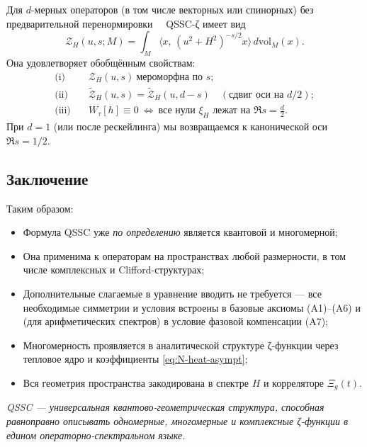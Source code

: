 \documentclass{article}
\numberwithin{equation}{section}
\theoremstyle{plain}
\theoremstyle{definition}
\theoremstyle{remark}
\begin{document}
Для \(d\)-мерных операторов (в том числе векторных или спинорных) без предварительной перенормировки  
QSSC-ζ имеет вид
\begin{equation}\label{eq:N-QSSC-general}
\mathcal Z_H(u,s;M)
=\int_M \big\langle x,\,(u^2+H^2)^{-s/2}x\big\rangle\,d\mathrm{vol}_M(x).
\end{equation}
Она удовлетворяет обобщённым свойствам:
\begin{align}
\text{(i)}\quad & \mathcal Z_H(u,s)\ \text{мероморфна по } s; \\
\text{(ii)}\quad & \widetilde{\mathcal Z}_H(u,s)=\widetilde{\mathcal Z}_H(u,d-s) \quad (\text{сдвиг оси на } d/2); \\
\text{(iii)}\quad & W_\tau[h]\equiv0\ \Longleftrightarrow\ \text{все нули }\xi_H\text{ лежат на }\Re s=\frac{d}{2}.
\end{align}
При \(d=1\) (или после рескейлинга) мы возвращаемся к канонической оси \(\Re s = 1/2\).
~\cite{Seeley1967, Elizalde1995}

\subsection*{Заключение}

Таким образом:

\begin{itemize}
\item Формула QSSC уже \emph{по определению} является квантовой и многомерной;
\item Она применима к операторам на пространствах любой размерности, в том числе комплексных и Clifford-структурах;
\item Дополнительные слагаемые в уравнение вводить не требуется — все необходимые симметрии и условия встроены в базовые аксиомы (A1)–(A6) и (для арифметических спектров) в условие фазовой компенсации (A7);
\item Многомерность проявляется в аналитической структуре ζ-функции через тепловое ядро и коэффициенты \eqref{eq:N-heat-asympt};
\item Вся геометрия пространства закодирована в спектре \(H\) и корреляторе \(\Xi_g(t)\).
\end{itemize}

\begin{center}
\textit{QSSC — универсальная квантово-геометрическая структура,
способная равноправно описывать одномерные, многомерные и комплексные ζ-функции
в едином операторно-спектральном языке.}
\end{center}
\end{document}

